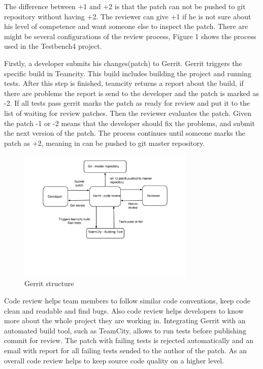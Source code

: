\documentclass{article}
\begin{document}
  The difference between +1 and +2 is that the patch can not be pushed to git
  repository without having +2. The reviewer can give +1 if he is not sure about his level of competence
  and want someone else to inspect the patch. There are might be several configurations of the review process,
  Figure 1 shows the process used in the Testbench4 project.

  Firstly, a developer submits his changes(patch) to Gerrit. Gerrit triggers the
  specific build in Teamcity. This build includes building the project and
  running tests. After this step is finished, teamcity returns a report about the build, if there are problems 
  the report is send to the developer and the patch is marked as -2. If all
  tests pass gerrit marks the patch as ready for review and put it to the list of waiting for review patches.
  Then the reviewer evaluates the patch. Given the patch -1 or -2 means that the developer should fix the problems,
  and submit the next version of the patch. The process continues until someone
  marks the patch as +2,  meaning in can be pushed to git master repository.
    \begin{figure}
      \includegraphics[width=0.75\textwidth]{gerrit1.png}
      \caption{Gerrit structure}
    \end{figure}
  Code review helps team members to follow similar code conventions, 
  keep code clean and readable and find bugs. Also code review helps developers to know more about 
  the whole project they are working in. Integrating Gerrit with an automated build tool, 
  such as TeamCity, allows to run tests before publishing commit for review. 
  The patch with failing tests is rejected automatically and an email with report for all failing tests sended 
  to the author of the patch. As an overall code review helps to keep source code quality on a higher level.
\end{document}
